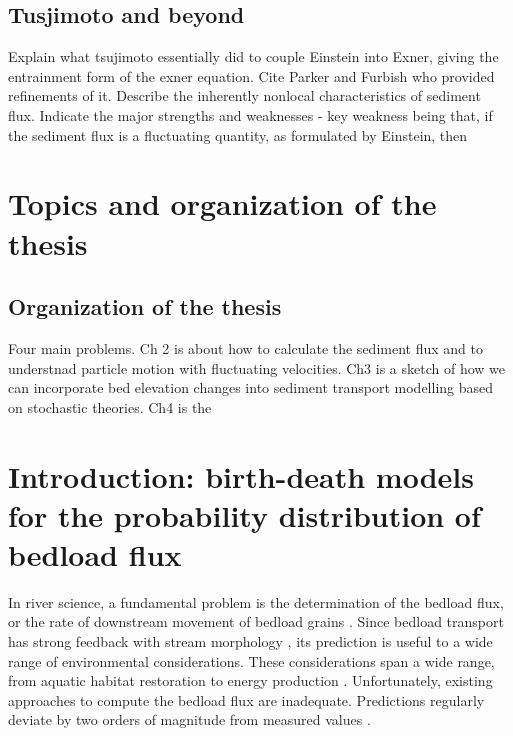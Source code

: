  


\subsection{Tusjimoto and beyond}
Explain what tsujimoto essentially did to couple Einstein into Exner, giving the entrainment form of the exner equation.
Cite Parker and Furbish who provided refinements of it.
Describe the inherently nonlocal characteristics of sediment flux.
Indicate the major strengths and weaknesses -  key weakness being that, if the sediment flux is a fluctuating quantity, as formulated by Einstein, then 

\section{Topics and organization of the thesis} 




\subsection{Organization of the thesis}

Four main problems. Ch 2 is about how to calculate the sediment flux and to understnad particle motion with fluctuating velocities.
Ch3 is a sketch of how we can incorporate bed elevation changes into sediment transport modelling based on stochastic theories.
Ch4 is the 

\section{Introduction: birth-death models for the probability distribution of bedload flux}

In river science, a fundamental problem is the determination of the bedload flux, or the rate of downstream movement of bedload grains \citep{Ballio2014}.
Since bedload transport has strong feedback with stream morphology \citep{Church2006, Recking2016}, its prediction is useful to a wide range of environmental considerations. 
These considerations span a wide range, from aquatic habitat restoration to energy production \citep{Kondolf2014, Wohl2015a}. 
Unfortunately, existing approaches to compute the bedload flux are inadequate. 
Predictions regularly deviate by two orders of magnitude from measured values \citep{Gomez1989, Barry2004, Bathurst2007a, Recking2012}. 

